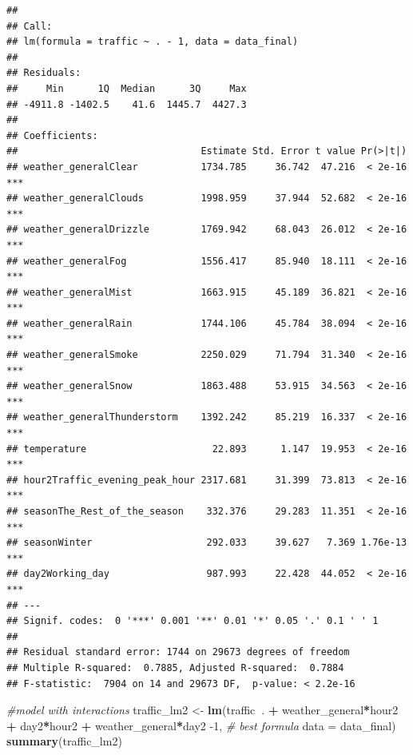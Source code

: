 \documentclass[
]{article}
\newenvironment{Shaded}{\begin{snugshade}}{\end{snugshade}}
\newcommand{\CommentTok}[1]{\textcolor[rgb]{0.56,0.35,0.01}{\textit{#1}}}
\newcommand{\DataTypeTok}[1]{\textcolor[rgb]{0.13,0.29,0.53}{#1}}
\newcommand{\DecValTok}[1]{\textcolor[rgb]{0.00,0.00,0.81}{#1}}
\newcommand{\KeywordTok}[1]{\textcolor[rgb]{0.13,0.29,0.53}{\textbf{#1}}}
\newcommand{\NormalTok}[1]{#1}
\newcommand{\OperatorTok}[1]{\textcolor[rgb]{0.81,0.36,0.00}{\textbf{#1}}}
\newcommand{\StringTok}[1]{\textcolor[rgb]{0.31,0.60,0.02}{#1}}
\begin{document}
\begin{verbatim}
## 
## Call:
## lm(formula = traffic ~ . - 1, data = data_final)
## 
## Residuals:
##     Min      1Q  Median      3Q     Max 
## -4911.8 -1402.5    41.6  1445.7  4427.3 
## 
## Coefficients:
##                                Estimate Std. Error t value Pr(>|t|)    
## weather_generalClear           1734.785     36.742  47.216  < 2e-16 ***
## weather_generalClouds          1998.959     37.944  52.682  < 2e-16 ***
## weather_generalDrizzle         1769.942     68.043  26.012  < 2e-16 ***
## weather_generalFog             1556.417     85.940  18.111  < 2e-16 ***
## weather_generalMist            1663.915     45.189  36.821  < 2e-16 ***
## weather_generalRain            1744.106     45.784  38.094  < 2e-16 ***
## weather_generalSmoke           2250.029     71.794  31.340  < 2e-16 ***
## weather_generalSnow            1863.488     53.915  34.563  < 2e-16 ***
## weather_generalThunderstorm    1392.242     85.219  16.337  < 2e-16 ***
## temperature                      22.893      1.147  19.953  < 2e-16 ***
## hour2Traffic_evening_peak_hour 2317.681     31.399  73.813  < 2e-16 ***
## seasonThe_Rest_of_the_season    332.376     29.283  11.351  < 2e-16 ***
## seasonWinter                    292.033     39.627   7.369 1.76e-13 ***
## day2Working_day                 987.993     22.428  44.052  < 2e-16 ***
## ---
## Signif. codes:  0 '***' 0.001 '**' 0.01 '*' 0.05 '.' 0.1 ' ' 1
## 
## Residual standard error: 1744 on 29673 degrees of freedom
## Multiple R-squared:  0.7885, Adjusted R-squared:  0.7884 
## F-statistic:  7904 on 14 and 29673 DF,  p-value: < 2.2e-16
\end{verbatim}

\begin{Shaded}
\begin{Highlighting}[]
\CommentTok{#model with interactions}
\NormalTok{traffic_lm2 <-}\StringTok{ }\KeywordTok{lm}\NormalTok{(traffic}\OperatorTok{~}\NormalTok{. }\OperatorTok{+}\StringTok{ }\NormalTok{weather_general}\OperatorTok{*}\NormalTok{hour2  }\OperatorTok{+}\StringTok{ }\NormalTok{day2}\OperatorTok{*}\NormalTok{hour2 }\OperatorTok{+}\StringTok{ }\NormalTok{weather_general}\OperatorTok{*}\NormalTok{day2 }\DecValTok{-1}\NormalTok{, }\CommentTok{# best formula}
                 \DataTypeTok{data =}\NormalTok{ data_final)}
\KeywordTok{summary}\NormalTok{(traffic_lm2)}
\end{Highlighting}
\end{Shaded}
\end{document}
